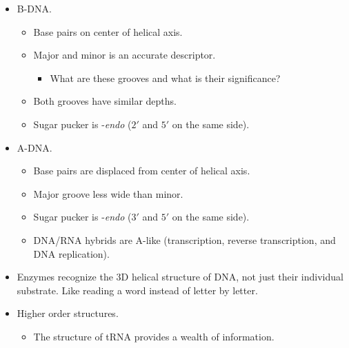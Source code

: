 \documentclass[../notes.tex]{subfiles}
\begin{document}
\begin{itemize}
\begin{itemize}
        \begin{itemize}
            \item A-DNA is \SI{2.9}{\angstrom};
            \item B-DNA is \SIrange{3.3}{3.4}{\angstrom};
            \item Z-DNA is \SI{3.7}{\angstrom}.
        \end{itemize}
        \item Other important numbers?
        \item In B-DNA, the base pairs are relatively centered within the strand; in A-form, they rotate around.
    \end{itemize}
    \item B-DNA.
    \begin{itemize}
        \item Base pairs on center of helical axis.
        \item Major and minor is an accurate descriptor.
        \begin{itemize}
            \item What are these grooves and what is their significance?
        \end{itemize}
        \item Both grooves have similar depths.
        \item Sugar pucker is -\emph{endo} ($2'$ and $5'$ on the same side).
    \end{itemize}
    \item A-DNA.
    \begin{itemize}
        \item Base pairs are displaced from center of helical axis.
        \item Major groove less wide than minor.
        \item Sugar pucker is -\emph{endo} ($3'$ and $5'$ on the same side).
        \item DNA/RNA hybrids are A-like (transcription, reverse transcription, and DNA replication).
    \end{itemize}
    \item Enzymes recognize the 3D helical structure of DNA, not just their individual substrate. Like reading a word instead of letter by letter.
    \item Higher order structures.
    \begin{itemize}
        \item The structure of tRNA provides a wealth of information.
        \begin{itemize}

\end{itemize}
\end{itemize}
\end{itemize}
\end{document}
